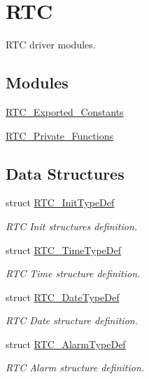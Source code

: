\hypertarget{group___r_t_c}{\section{R\-T\-C}
\label{group___r_t_c}
}


R\-T\-C driver modules.  


\subsection*{Modules}
\begin{DoxyCompactItemize}
\item 
\hyperlink{group___r_t_c___exported___constants}{R\-T\-C\-\_\-\-Exported\-\_\-\-Constants}
\item 
\hyperlink{group___r_t_c___private___functions}{R\-T\-C\-\_\-\-Private\-\_\-\-Functions}
\end{DoxyCompactItemize}
\subsection*{Data Structures}
\begin{DoxyCompactItemize}
\item 
struct \hyperlink{struct_r_t_c___init_type_def}{R\-T\-C\-\_\-\-Init\-Type\-Def}
\begin{DoxyCompactList}\small\item\em R\-T\-C Init structures definition. \end{DoxyCompactList}\item 
struct \hyperlink{struct_r_t_c___time_type_def}{R\-T\-C\-\_\-\-Time\-Type\-Def}
\begin{DoxyCompactList}\small\item\em R\-T\-C Time structure definition. \end{DoxyCompactList}\item 
struct \hyperlink{struct_r_t_c___date_type_def}{R\-T\-C\-\_\-\-Date\-Type\-Def}
\begin{DoxyCompactList}\small\item\em R\-T\-C Date structure definition. \end{DoxyCompactList}\item 
struct \hyperlink{struct_r_t_c___alarm_type_def}{R\-T\-C\-\_\-\-Alarm\-Type\-Def}
\begin{DoxyCompactList}\small\item\em R\-T\-C Alarm structure definition. \end{DoxyCompactList}\end{DoxyCompactItemize}

